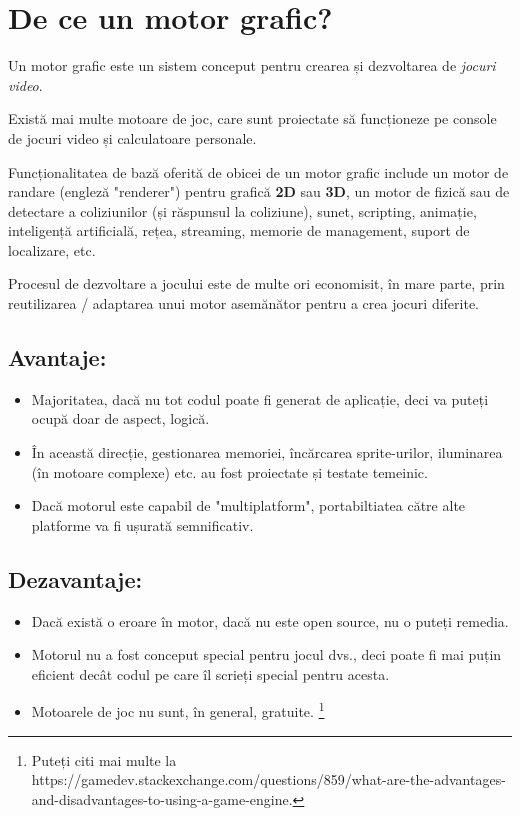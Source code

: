 \documentclass[12pt]{article}
\begin{document}
\section{De ce un motor grafic?}
\hspace{10pt}
Un motor grafic este un sistem conceput pentru crearea și dezvoltarea de {\it jocuri video}. \par Există mai multe motoare de joc, care sunt proiectate să funcționeze pe console de jocuri video și calculatoare personale. 
\par Funcționalitatea de bază oferită de obicei de un motor grafic include un motor de randare (engleză "renderer") pentru grafică {\bf 2D} sau {\bf 3D}, un motor de fizică sau de detectare a coliziunilor (și răspunsul la coliziune), sunet, scripting, animație, inteligență artificială, rețea, streaming, memorie de management, suport de localizare, etc. \par Procesul de dezvoltare a jocului este de multe ori economisit, în mare parte, prin reutilizarea / adaptarea unui motor asemănător pentru a crea jocuri diferite.
\subsection
{\bf Avantaje:}
\begin {itemize}
\item Majoritatea, dacă nu tot codul poate fi generat de aplicație, deci va puteți ocupă doar de aspect, logică.
\item În această direcție, gestionarea memoriei, încărcarea sprite-urilor, iluminarea (în motoare complexe) etc. au fost proiectate și testate temeinic.
\item Dacă motorul este capabil de "multiplatform", portabiltiatea către alte platforme va fi ușurată semnificativ.
\end{itemize}

\subsection
{\bf Dezavantaje:}
\begin {itemize}
\item Dacă există o eroare în motor, dacă nu este open source, nu o puteți remedia.
\item Motorul nu a fost conceput special pentru jocul dvs., deci poate fi mai puțin eficient decât codul pe care îl scrieți special pentru acesta.
\item Motoarele de joc nu sunt, în general, gratuite.  \footnote[2]{Puteți citi mai multe la https://gamedev.stackexchange.com/questions/859/what-are-the-advantages-and-disadvantages-to-using-a-game-engine.}
\end{itemize}
\end{document}
